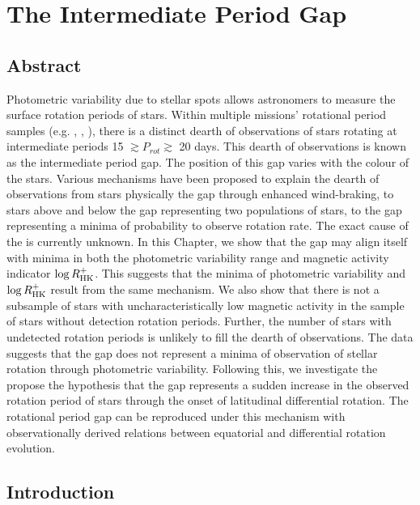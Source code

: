 
\newcommand\rper{$R_{\rm{var}}$}


\chapter{The Intermediate Period Gap}
\label{chap:period_gap}

\section*{Abstract}


Photometric variability due to stellar spots allows astronomers to measure the surface rotation periods of stars.
Within multiple missions' rotational period samples (e.g. \kepler, \ktoo, \ZTF), there is a distinct dearth of observations of stars rotating at intermediate periods 15 $\gtrsim P_{rot} \gtrsim$ 20 days.
This dearth of observations is known as the intermediate period gap.
The position of this gap varies with the colour of the stars.
Various mechanisms have been proposed to explain the dearth of observations from stars physically  the gap through enhanced wind-braking, to stars above and below the gap representing two populations of stars, to the gap representing a minima of probability to observe rotation rate.
The exact cause of the  is currently unknown.
In this Chapter, we show that the gap may align itself with minima in both the photometric variability range and magnetic activity indicator $\log R^{+}_{\rm{HK}}$.
This suggests that the minima of photometric variability and $\log R^{+}_{\rm{HK}}$ result from the same mechanism.
We also show that there is not a subsample of stars with uncharacteristically low magnetic activity in the sample of stars without detection rotation periods.
Further, the number of stars with undetected rotation periods is unlikely to fill the dearth of observations.
The data suggests that the gap does not represent a minima of observation of stellar rotation through photometric variability.
Following this, we investigate the propose the hypothesis that the gap represents a sudden increase in the observed rotation period of stars through the onset of latitudinal differential rotation.
The rotational period gap can be reproduced under this mechanism with observationally derived relations between equatorial and differential rotation evolution.

\newpage

\section{Introduction}
\label{sec:intro}

